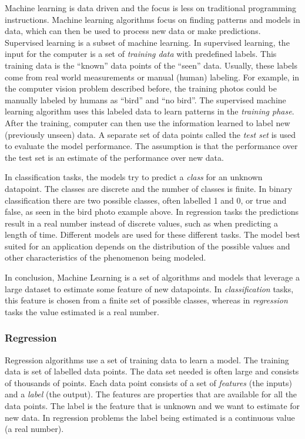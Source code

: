 Machine learning is data driven and the focus is less on traditional programming instructions.
Machine learning algorithms focus on finding patterns and models in data,
which can then be used to process new data or make predictions.
Supervised learning is a subset of machine learning. 
In supervised learning, the input for the computer is a set of \textit{training data} with predefined labels. 
This training data is the ``known'' data points of the ``seen'' data.
Usually, these labels come from real world measurements or manual (human) labeling.
For example, in the computer vision problem described before, the training photos could be manually labeled by humans as ``bird'' and ``no bird''.
The supervised machine learning algorithm uses this labeled data to learn patterns in the \emph{training phase}. After the training, computer can then use the information learned to label new (previously unseen) data.
A separate set of data points called the \emph{test set} is used to evaluate the model performance.
The assumption is that the performance over the test set is an estimate of the performance over new data.

In classification tasks, the models try to predict a \emph{class} for an unknown datapoint. The classes are discrete and the number of classes is finite. In binary classification there are two possible classes, often labelled 1 and 0, or true and false, as seen in the bird photo example above. In regression tasks the predictions result in a real number instead of discrete values, such as when predicting a length of time.
Different models are used for these different tasks.
The model best suited for an application depends on the distribution of the possible values and other characteristics of the phenomenon being modeled.

In conclusion, Machine Learning is a set of algorithms and models that leverage a large dataset to estimate some feature of new datapoints.
In \textit{classification} tasks, this feature is chosen from a finite set of possible classes, whereas in \textit{regression} tasks the value estimated is a real number.

\subsubsection{Regression}

Regression algorithms use a set of training data to learn a model.
The training data is set of labelled data points.
The data set needed is often large and consists of thousands of points.
Each data point consists of a set of \emph{features} (the inputs) and a \emph{label} (the output).
The features are properties that are available for all the data points.
The label is the feature that is unknown and we want to estimate for new data.
In regression problems the label being estimated is a continuous value (a real number).

